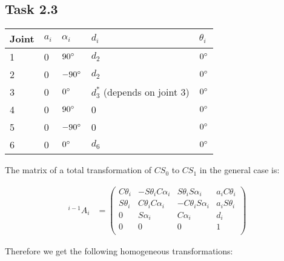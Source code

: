 \subsection*{Task 2.3}

\begin{center}
	\begin{tabular}{ | l | l | l | l | l |}
		\hline
		Joint & $a_{i}$ & $\alpha_{i}$ & $d_i$ & $\theta_i$ \\ \hline
		1 & 0 & $90\degree$ & $d_2$ & $0\degree$\\ \hline
		2 & 0 & $-90\degree$ & $d_2$ & $0\degree$\\ \hline
		3 & 0 & $0\degree$ & $d^*_3$ (depends on joint 3) & $0\degree$\\ \hline
		4 & 0 & $90\degree$ & 0 & $0\degree$\\ \hline
		5 & 0 & $-90\degree$ & 0 & $0\degree$\\ \hline
		6 & 0 & $0\degree$ & $d_6$ & $0\degree$\\ \hline
	\end{tabular}
\end{center}

The matrix of a total transformation of $CS_0$ to $CS_1$ in the general case is:

\begin{align*}
^{i-1}A_i &= 
\begin{pmatrix}
C\theta_i & -S\theta_iC\alpha_i & S\theta_iS\alpha_i & a_iC\theta_i \\
S\theta_i & C\theta_iC\alpha_i & -C\theta_iS\alpha_i & a_iS\theta_i \\
0 & S\alpha_i & C\alpha_i & d_i \\
0 & 0 & 0 & 1 \\
\end{pmatrix}
\end{align*}

Therefore we get the following homogeneous transformations: